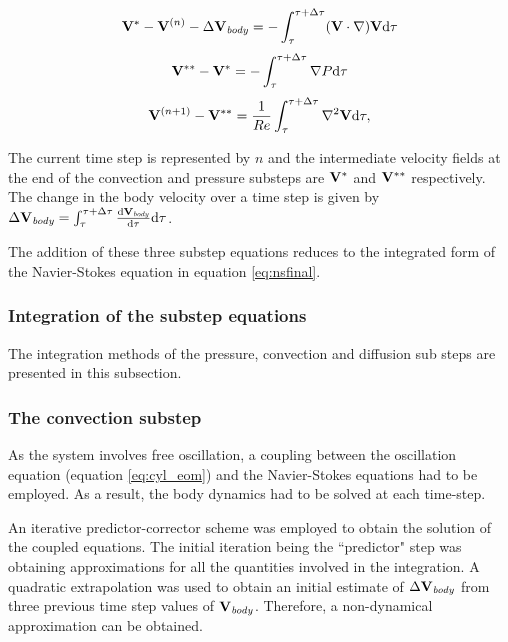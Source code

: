 \begin{equation} \centering
\label{eq:substep1}
\Vint - \Vn - \Delta\Vcyl = -\int_{\tau}^{\tau+\Delta\tau}(\vecV\cdot\nabla)\vecV \mathrm{d}\tau
\end{equation}
\begin{equation} \centering
\label{eq:substep2}
\Vintint - \Vint = -\int_{\tau}^{\tau+\Delta\tau}\nabla\Pres \mathrm{d}\tau
\end{equation}
\begin{equation} \centering
\label{eq:substep3}
\Vnext-\Vintint = \frac{1}{\reynoldsnumber}\int_{\tau}^{\tau+\Delta\tau}\gradsq{\vecV} \mathrm{d}\tau,
\end{equation} 
 
The current time step is represented by $n$ and the intermediate velocity fields at the end of the convection and pressure substeps are $\mathbf{V}^{*}$ and $\mathbf{V}^{**}$ respectively. The change in the body velocity over a time step is given by $\Delta\mathbf{V}_{\mathit{body}} =
\int_{\tau}^{\tau+\Delta\tau}\frac{\mathrm{d}\mathbf{V}_{\mathit{body}}}{\mathrm{d}\tau} \mathrm{d}\tau$. 

The addition of these three substep equations reduces to the integrated form of the Navier-Stokes equation in equation \ref{eq:nsfinal}. 



\subsubsection{Integration of the substep equations}
\label{subsec:sol}
 
 The integration methods of the pressure, convection and diffusion sub steps are presented in this subsection.
 
 \subsubsection{The convection substep}
 \label{subsub:convec}
 
As the system involves free oscillation, a coupling between the oscillation equation (equation \ref{eq:cyl_eom}) and the Navier-Stokes equations had to be employed. As a result, the body dynamics had to be solved at each time-step.

An iterative predictor-corrector scheme was employed to obtain the solution of the coupled equations. The initial iteration being the ``predictor" step was obtaining approximations for all the quantities involved in  the integration. A quadratic extrapolation was used to obtain an initial estimate of $\Delta\mathbf{V}_{\mathit{body}}$ from  three previous time step values of $\mathbf{V}_{\mathit{body}}$. Therefore, a non-dynamical approximation can be obtained.  
 
